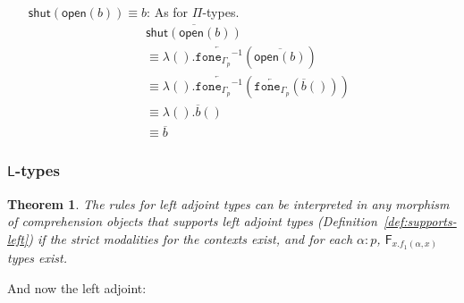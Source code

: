 \documentclass[10pt]{article}
\newtheorem{theorem}{Theorem}
\theoremstyle{definition}
\newcommand{\rewrite}[2]{\overleftarrow{#1}(#2)}
\newcommand\UE[2]{\ensuremath{#1(#2)}}
\newcommand\UI[2]{\ensuremath{\lambda #1.#2}}
\newcommand{\modeof}[1]{{#1}_p}
\newcommand{\upstairs}[1]{\overline{#1}}
\newcommand\fone[1]{\ensuremath{\mathtt{fone}_{#1}}}
\newcommand\foneinv[1]{\ensuremath{\fone{#1}^{-1}}}
\newcommand{\RI}[1]{\mathsf{shut}({#1})}
\newcommand{\RE}[1]{\mathsf{open}({#1})}
\begin{document}
\begin{enumerate}[style = multiline, labelwidth = 80pt]
\item[{$\RI{\RE{b}} \equiv b$}:] As for $\Pi$-types.
\begin{align*}
&\upstairs{\RI{\RE{b}}} \\
&\equiv \UI{()}{\rewrite{\foneinv{\modeof{\Gamma}}}{\upstairs{\RE{b}}}} \\
&\equiv \UI{()}{\rewrite{\foneinv{\modeof{\Gamma}}}{\rewrite{\fone{\modeof{\Gamma}}}{\UE{\upstairs{b}}{}}}} \\
&\equiv \UI{()}{\UE{\upstairs{b}}{}} \\
&\equiv \upstairs{b}
\end{align*}
\end{enumerate}

\subsubsection{$\mathsf{L}$-types}

\begin{theorem}
  The rules for left adjoint types can be interpreted in any morphism of
  comprehension objects that supports left adjoint types
  (Definition~\ref{def:supports-left}) if the strict modalities for the
  contexts exist, and for each $\alpha : p$,
  $\mathsf{F}_{x.f_1(\alpha,x)}$ types exist.
\end{theorem}

And now the left adjoint:
\end{document}
